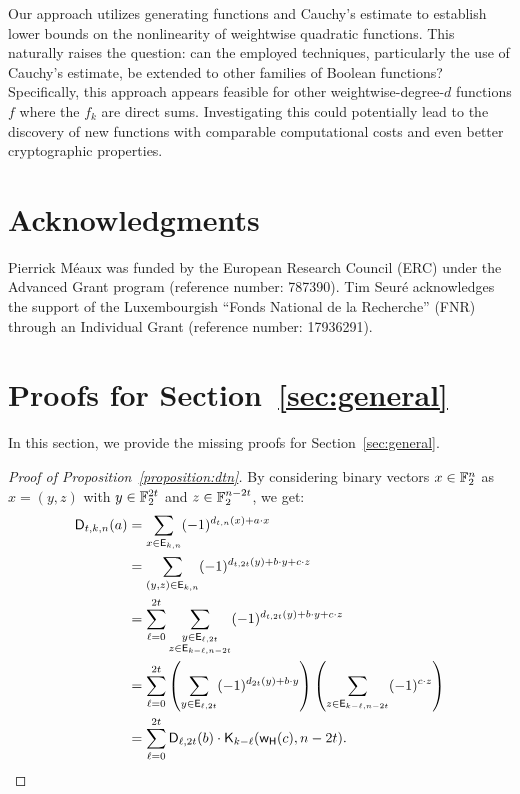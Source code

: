 \documentclass{llncs}
\begin{document}
Our approach utilizes generating functions and Cauchy’s estimate to establish lower bounds on the nonlinearity of weightwise quadratic functions. This naturally raises the question: can the employed techniques, particularly the use of Cauchy’s estimate, be extended to other families of Boolean functions? Specifically, this approach appears feasible for other weightwise-degree-$d$ functions $f$ where the $f_k$ are direct sums. Investigating this could potentially lead to the discovery of new functions with comparable computational costs and even better cryptographic properties.

\ifnum{}
	\section{Acknowledgments}
	Pierrick Méaux was funded by the European Research Council (\textsf{ERC}) under the Advanced Grant program (reference number: 787390). Tim Seuré acknowledges the support of the Luxembourgish “Fonds National de la Recherche” (\textsf{FNR}) through an Individual Grant (reference number: 17936291).
\fi

\newpage




\appendix

\section{Proofs for Section~\ref{sec:general}}\label{sec:proofs}

In this section, we provide the missing proofs for Section~\ref{sec:general}.

\begin{proof}[Proof of Proposition~\ref{proposition:dtn}]
    By considering binary vectors $x\in\mathbb{F}_2^n$ as $x=(y,z)$ with $y\in\mathbb{F}_2^{2t}$ and $z\in\mathbb{F}_2^{n-2t}$, we get:	
	\begin{align*}
		\mathsf{D}_{t,k,n}(a)&=\sum_{x \in \mathsf{E}_{k,n}} (-1)^{d_{t,n}(x)+a \cdot x}\\
		&=\sum_{(y,z)\in\mathsf{E}_{k,n}} (-1)^{d_{t,2t}(y)+b \cdot y +c \cdot z}\\
		&=\sum_{\ell=0}^{2t} \sum_{\substack{y \in \mathsf{E}_{\ell,2t}\\z \in \mathsf{E}_{k-\ell,n-2t}}} (-1)^{d_{t,2t}(y)+b \cdot y +c \cdot z}\\
		&=\sum_{\ell=0}^{2t}\left(\sum_{y \in \mathsf{E}_{\ell,2t}} (-1)^{d_{2t}(y)+b \cdot y}\right)\left( \sum_{z \in \mathsf{E}_{k-\ell,n-2t}} (-1)^{c \cdot z}\right)\\&=\sum_{\ell=0}^{2t} \mathsf{D}_{\ell,2t}(b)\cdot\mathsf{K}_{k-\ell}(\mathsf{w_H}(c),n-2t).\qedhere
	\end{align*}
\end{proof}
\end{document}
